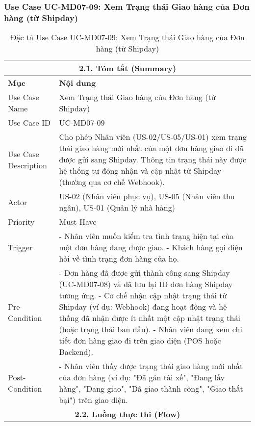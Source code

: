 \subsubsection{Use Case UC-MD07-09: Xem Trạng thái Giao hàng của Đơn hàng (từ Shipday)}
\begin{longtable}{|m{4cm}|p{11cm}|}
\caption{Đặc tả Use Case UC-MD07-09: Xem Trạng thái Giao hàng của Đơn hàng (từ Shipday)} \label{tab:uc_md07_09_final_full} \\
\hline
\multicolumn{2}{|c|}{\textbf{2.1. Tóm tắt (Summary)}} \\
\hline
\textbf{Mục} & \textbf{Nội dung} \\
\hline
\endhead %
\hline
\endfoot %
\hline
\endlastfoot %
Use Case Name & Xem Trạng thái Giao hàng của Đơn hàng (từ Shipday) \\
\hline
Use Case ID & UC-MD07-09 \\
\hline
Use Case Description & Cho phép Nhân viên (US-02/US-05/US-01) xem trạng thái giao hàng mới nhất của một đơn hàng giao đi đã được gửi sang Shipday. Thông tin trạng thái này được hệ thống tự động nhận và cập nhật từ Shipday (thường qua cơ chế Webhook). \\
\hline
Actor & US-02 (Nhân viên phục vụ), US-05 (Nhân viên thu ngân), US-01 (Quản lý nhà hàng) \\
\hline
Priority & Must Have \\
\hline
Trigger & - Nhân viên muốn kiểm tra tình trạng hiện tại của một đơn hàng đang được giao. \newline - Khách hàng gọi điện hỏi về tình trạng đơn hàng của họ. \\
\hline
Pre-Condition & - Đơn hàng đã được gửi thành công sang Shipday (UC-MD07-08) và đã lưu lại ID đơn hàng Shipday tương ứng. \newline - Cơ chế nhận cập nhật trạng thái từ Shipday (ví dụ: Webhook) đang hoạt động và hệ thống đã nhận được ít nhất một cập nhật trạng thái (hoặc trạng thái ban đầu). \newline - Nhân viên đang xem chi tiết đơn hàng giao đi trên giao diện (POS hoặc Backend). \\
\hline
Post-Condition & - Nhân viên thấy được trạng thái giao hàng mới nhất của đơn hàng (ví dụ: "Đã gán tài xế", "Đang lấy hàng", "Đang giao", "Đã giao thành công", "Giao thất bại") trên giao diện. \\
\hline
\multicolumn{2}{|c|}{\textbf{2.2. Luồng thực thi (Flow)}} \\

\end{longtable}
